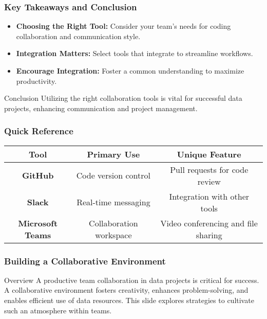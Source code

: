 \documentclass[aspectratio=169]{beamer}
\begin{document}
\begin{frame}[fragile]
    \frametitle{Key Takeaways and Conclusion}
    \begin{itemize}
        \item \textbf{Choosing the Right Tool:} Consider your team's needs for coding collaboration and communication style.
        \item \textbf{Integration Matters:} Select tools that integrate to streamline workflows.
        \item \textbf{Encourage Integration:} Foster a common understanding to maximize productivity.
    \end{itemize}
    \begin{block}{Conclusion}
        Utilizing the right collaboration tools is vital for successful data projects, enhancing communication and project management.
    \end{block}
\end{frame}

\begin{frame}[fragile]
    \frametitle{Quick Reference}
    \begin{table}[h]
        \centering
        \begin{tabular}{|c|c|c|}
            \hline
            \textbf{Tool} & \textbf{Primary Use} & \textbf{Unique Feature} \\ \hline
            \textbf{GitHub} & Code version control & Pull requests for code review \\ \hline
            \textbf{Slack} & Real-time messaging & Integration with other tools \\ \hline
            \textbf{Microsoft Teams} & Collaboration workspace & Video conferencing and file sharing \\ \hline
        \end{tabular}
    \end{table}
\end{frame}

\begin{frame}[fragile]
    \frametitle{Building a Collaborative Environment}
    \begin{block}{Overview}
        A productive team collaboration in data projects is critical for success. 
        A collaborative environment fosters creativity, enhances problem-solving, 
        and enables efficient use of data resources. This slide explores strategies 
        to cultivate such an atmosphere within teams.
    \end{block}
\end{frame}
\end{document}
